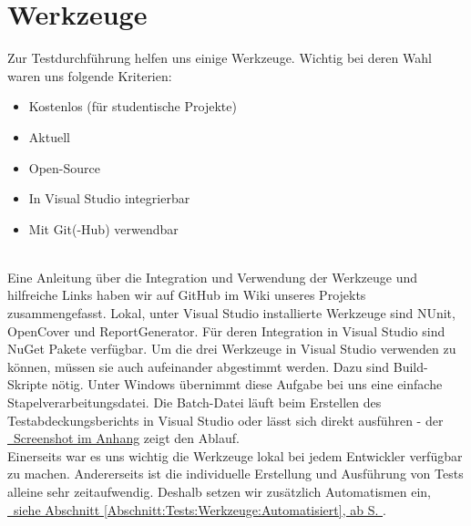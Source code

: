 %



\newpage



\section{Werkzeuge}
\label{Abschnitt:Tests:Werkzeuge}

Zur Testdurchführung helfen uns einige Werkzeuge. Wichtig bei deren Wahl waren uns folgende Kriterien:\\

\begin{itemize}

	\item Kostenlos (für studentische Projekte)
	\item Aktuell
	\item Open-Source
	\item In Visual Studio integrierbar
	\item Mit Git(-Hub) verwendbar

\end{itemize}

~\\

Eine Anleitung über die Integration und Verwendung der Werkzeuge und hilfreiche Links haben wir auf GitHub im Wiki unseres Projekts zusammengefasst. Lokal, unter Visual Studio installierte Werkzeuge sind NUnit, OpenCover und ReportGenerator. Für deren Integration in Visual Studio sind NuGet Pakete verfügbar. Um die drei Werkzeuge in Visual Studio verwenden zu können, müssen sie auch aufeinander abgestimmt werden. Dazu sind  Build-Skripte nötig. Unter Windows übernimmt diese Aufgabe bei uns eine einfache Stapelverarbeitungsdatei. Die \glqq Batch\grqq-Datei läuft beim Erstellen des Testabdeckungsberichts in Visual Studio oder lässt sich direkt ausführen - der \hyperref[Abb:Werkzeuge:Coverage_Build_Batch]{\mousecursor~Screenshot im Anhang} zeigt den Ablauf.\\

Einerseits war es uns wichtig die Werkzeuge lokal bei jedem Entwickler verfügbar zu machen. Andererseits ist die individuelle Erstellung und Ausführung von Tests alleine sehr zeitaufwendig. Deshalb setzen wir zusätzlich Automatismen ein, \hyperref[Abschnitt:Tests:Werkzeuge:Automatisiert]{\mousecursor~siehe Abschnitt \ref{Abschnitt:Tests:Werkzeuge:Automatisiert}, ab S. \pageref{Abschnitt:Tests:Werkzeuge:Automatisiert}}.
\\




